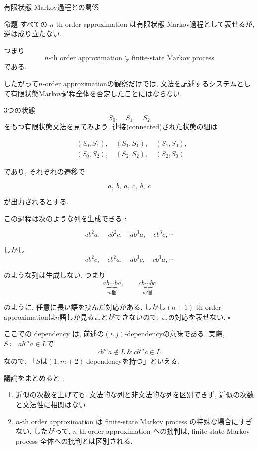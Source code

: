 \documentclass[dvipdfmx, xcolor={dvipsnames},12pt]{beamer}
\begin{document}
\begin{frame}{有限状態 Markov過程との関係}
\begin{block}{命題}
すべての \(n\)-th order approximation は有限状態 Markov過程として表せるが, 逆は成り立たない.
\end{block}

つまり
\[
\text{\(n\)-th order approximation}
\subsetneq
\text{finite-state Markov process}
\]
である.
\begin{marker}
したがって\(n\)-order approximationの観察だけでは, 文法を記述するシステムとして有限状態Markov過程全体を否定したことにはならない.
\end{marker}
\end{frame}

\begin{frame}
\:\:
3つの状態
\[
S_0,\quad S_1,\quad S_2
\]
をもつ有限状態文法を見てみよう. 連接(connected)された状態の組は

\begin{align*}
&(S_0,S_1),\quad (S_1,S_1),\quad (S_1,S_0),\\
&(S_0,S_2),\quad (S_2,S_2),\quad (S_2,S_0)
\end{align*}

であり, それぞれの遷移で

\[
a,\ b,\ a,\ c,\ b,\ c
\]

が出力されるとする.
\end{frame}

\begin{frame}
この過程は次のような列を生成できる : 

\[
a b^2 a,\quad c b^2 c, \quad a b^3 a,\quad c b^3 c, \cdots
\]

しかし
\[
a b^2 c,\quad c b^2 a, \quad a b^3 c,\quad c b^3 a, \cdots
\]

のような列は生成しない. つまり
\[
a\underbrace{b\cdots b}_{m\text{個}}a,
\qquad
c\underbrace{b\cdots b}_{m\text{個}}c
\]

のように, 任意に長い語を挟んだ対応がある. しかし$(n+1)$-th order approximationは$n$語しか見ることができないので, この対応を表せない. \hfill$\square$
\end{frame}

\begin{frame}
\begin{marker}
ここでの dependency は, 前述の\((i, j)\)-dependencyの意味である. 実際, $S \coloneq ab^ma \in L$で
\[
cb^ma \notin L\:\& \: cb^mc \in L
\]
なので, 「$S$は$(1, m+2)$-dependencyを持つ」といえる.
\end{marker}

議論をまとめると : 

\begin{enumerate}
  \item 近似の次数を上げても, 文法的な列と非文法的な列を区別できず, 近似の次数と文法性に相関はない.
  \item \(n\)-th order approximation は finite-state Markov process の特殊な場合にすぎない. したがって, \(n\)-th order approximation への批判は, finite-state Markov process 全体への批判とは区別される.
\end{enumerate}
\end{frame}
\end{document}
